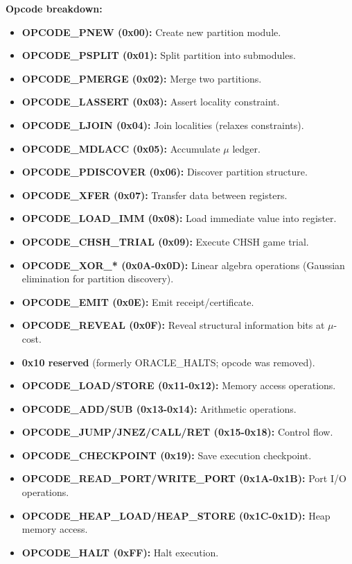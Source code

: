 \textbf{Opcode breakdown:}
\begin{itemize}
    \item \textbf{OPCODE\_PNEW (0x00):} Create new partition module.
    \item \textbf{OPCODE\_PSPLIT (0x01):} Split partition into submodules.
    \item \textbf{OPCODE\_PMERGE (0x02):} Merge two partitions.
    \item \textbf{OPCODE\_LASSERT (0x03):} Assert locality constraint.
    \item \textbf{OPCODE\_LJOIN (0x04):} Join localities (relaxes constraints).
    \item \textbf{OPCODE\_MDLACC (0x05):} Accumulate $\mu$ ledger.
    \item \textbf{OPCODE\_PDISCOVER (0x06):} Discover partition structure.
    \item \textbf{OPCODE\_XFER (0x07):} Transfer data between registers.
    \item \textbf{OPCODE\_LOAD\_IMM (0x08):} Load immediate value into register.
    \item \textbf{OPCODE\_CHSH\_TRIAL (0x09):} Execute CHSH game trial.
    \item \textbf{OPCODE\_XOR\_* (0x0A-0x0D):} Linear algebra operations (Gaussian elimination for partition discovery).
    \item \textbf{OPCODE\_EMIT (0x0E):} Emit receipt/certificate.
    \item \textbf{OPCODE\_REVEAL (0x0F):} Reveal structural information bits at $\mu$-cost.
    \item \textbf{0x10 reserved} (formerly ORACLE\_HALTS; opcode was removed).
    \item \textbf{OPCODE\_LOAD/STORE (0x11-0x12):} Memory access operations.
    \item \textbf{OPCODE\_ADD/SUB (0x13-0x14):} Arithmetic operations.
    \item \textbf{OPCODE\_JUMP/JNEZ/CALL/RET (0x15-0x18):} Control flow.
    \item \textbf{OPCODE\_CHECKPOINT (0x19):} Save execution checkpoint.
    \item \textbf{OPCODE\_READ\_PORT/WRITE\_PORT (0x1A-0x1B):} Port I/O operations.
    \item \textbf{OPCODE\_HEAP\_LOAD/HEAP\_STORE (0x1C-0x1D):} Heap memory access.
    \item \textbf{OPCODE\_HALT (0xFF):} Halt execution.
\end{itemize}

